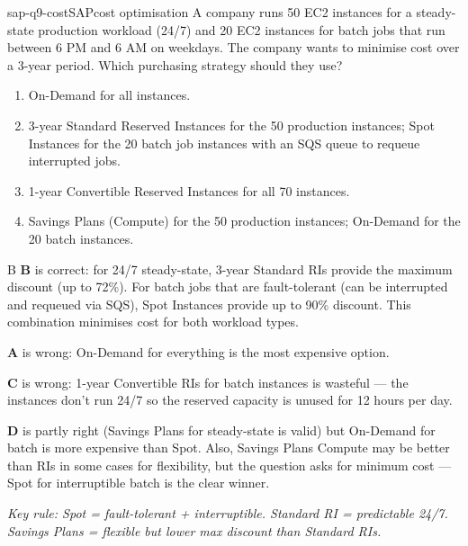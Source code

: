 \begin{question}{sap-q9-cost}{SAP}{cost optimisation}
A company runs 50 EC2 instances for a steady-state production workload (24/7) and 20 EC2 instances for batch jobs that run between 6 PM and 6 AM on weekdays. The company wants to minimise cost over a 3-year period. Which purchasing strategy should they use?

\begin{enumerate}[label=\Alph*.]
  \item On-Demand for all instances.
  \item 3-year Standard Reserved Instances for the 50 production instances; Spot Instances for the 20 batch job instances with an SQS queue to requeue interrupted jobs.
  \item 1-year Convertible Reserved Instances for all 70 instances.
  \item Savings Plans (Compute) for the 50 production instances; On-Demand for the 20 batch instances.
\end{enumerate}
\end{question}

\begin{answer}{B}
\textbf{B} is correct: for 24/7 steady-state, 3-year Standard RIs provide the maximum discount (up to 72\%). For batch jobs that are fault-tolerant (can be interrupted and requeued via SQS), Spot Instances provide up to 90\% discount. This combination minimises cost for both workload types.

\textbf{A} is wrong: On-Demand for everything is the most expensive option.

\textbf{C} is wrong: 1-year Convertible RIs for batch instances is wasteful --- the instances don't run 24/7 so the reserved capacity is unused for 12 hours per day.

\textbf{D} is partly right (Savings Plans for steady-state is valid) but On-Demand for batch is more expensive than Spot. Also, Savings Plans Compute may be better than RIs in some cases for flexibility, but the question asks for minimum cost --- Spot for interruptible batch is the clear winner.

\textit{Key rule: Spot = fault-tolerant + interruptible. Standard RI = predictable 24/7. Savings Plans = flexible but lower max discount than Standard RIs.}
\end{answer}

